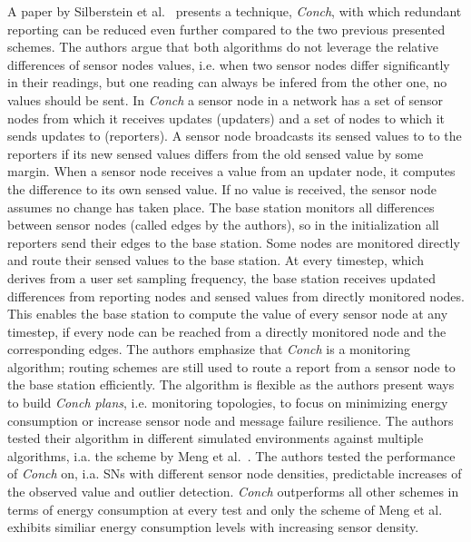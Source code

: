 A paper by Silberstein et al.~\cite{silberstein2006constraint} presents a
technique, \textit{Conch}, with which redundant reporting can be reduced even
further compared to the two previous presented schemes. The authors argue that
both algorithms do not leverage the relative differences of sensor nodes
values, i.e. when two sensor nodes differ significantly in their readings, but
one reading can always be infered from the other one, no values should be sent.
In \textit{Conch} a sensor node in a network has a set of sensor nodes from
which it receives updates (updaters) and a set of nodes to which it sends
updates to (reporters). A sensor node broadcasts its sensed values to to the
reporters if its new sensed values differs from the old sensed value by some
margin. When a sensor node receives a value from an updater node, it computes
the difference to its own sensed value. If no value is received, the sensor
node assumes no change has taken place. The base station monitors all
differences between sensor nodes (called edges by the authors), so in the
initialization all reporters send their edges to the base station. Some nodes
are monitored directly and route their sensed values to the base station. At
every timestep, which derives from a user set sampling frequency, the
base station receives updated differences from reporting nodes and sensed values
from directly monitored nodes. This enables the base station to compute the
value of every sensor node at any timestep, if every node can be reached from a
directly monitored node and the corresponding edges. The authors emphasize that
\textit{Conch} is a monitoring algorithm; routing schemes are still used to
route a report from a sensor node to the base station efficiently. The algorithm
is flexible as the authors present ways to build \textit{Conch plans}, i.e.
monitoring topologies, to focus on minimizing energy consumption or increase
sensor node and message failure resilience. The authors tested their algorithm
in different simulated environments against multiple algorithms, i.a. the
scheme by Meng et al.~\cite{meng2004event}. The authors tested the performance
of \textit{Conch} on, i.a. \acp{SN} with different sensor node densities,
predictable increases of the observed value and outlier detection.
\textit{Conch} outperforms all other schemes in terms of energy consumption at
every test and only the scheme of Meng et al. exhibits similiar energy
consumption levels with increasing sensor density.



